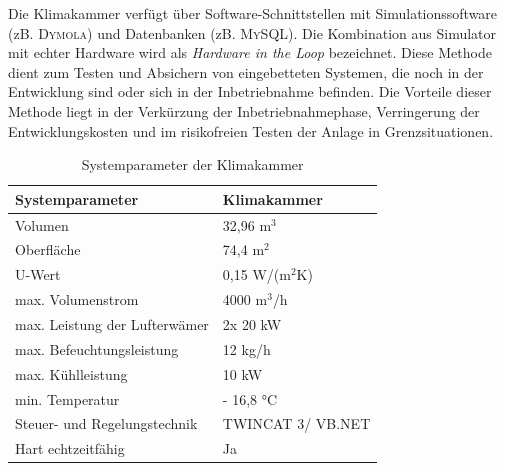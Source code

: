Die Klimakammer verfügt über Software-Schnittstellen  mit Simulationssoftware (zB. \textsc{Dymola}) und Datenbanken (zB. \textsc{MySQL}). Die Kombination aus Simulator mit echter Hardware wird als \textit{Hardware in the Loop} bezeichnet. Diese Methode dient zum Testen und Absichern von eingebetteten Systemen, die noch in der Entwicklung sind oder sich in der Inbetriebnahme befinden. Die Vorteile dieser Methode liegt in der Verkürzung der Inbetriebnahmephase, Verringerung der Entwicklungskosten und im risikofreien Testen der Anlage in Grenzsituationen. \citep{OPALRTT2014}


\begin{table}[htb]
\centering
\caption{Systemparameter der Klimakammer \citep{Nuerenberg2015}}\vspace{6pt}
\label{tab:Parameter KK}
\begin{tabular}{ll}
\hline 
\textbf{Systemparameter} & \textbf{Klimakammer} \\ 
\hline 
\hline
Volumen & 32,96 m$^3$ \\ 
\hline 
Oberfläche & 74,4 m$^2$ \\ 
\hline 
U-Wert & 0,15 W/(m$^2$K) \\ 
\hline 
max. Volumenstrom & 4000 m$^3$/h \\ 
\hline 
max. Leistung der Lufterwämer & 2x 20 kW \\ 
\hline 
max. Befeuchtungsleistung & 12 kg/h \\ 
\hline 
max. Kühlleistung & 10 kW \\ 
\hline 
min. Temperatur & - 16,8 °C \\ 
\hline 
Steuer- und Regelungstechnik & TWINCAT 3/ VB.NET \\ 
\hline 
Hart echtzeitfähig & Ja \\ 
\hline 
\hline
\end{tabular} 
\label{tab:Systemparameter-KK}
\end{table} 

